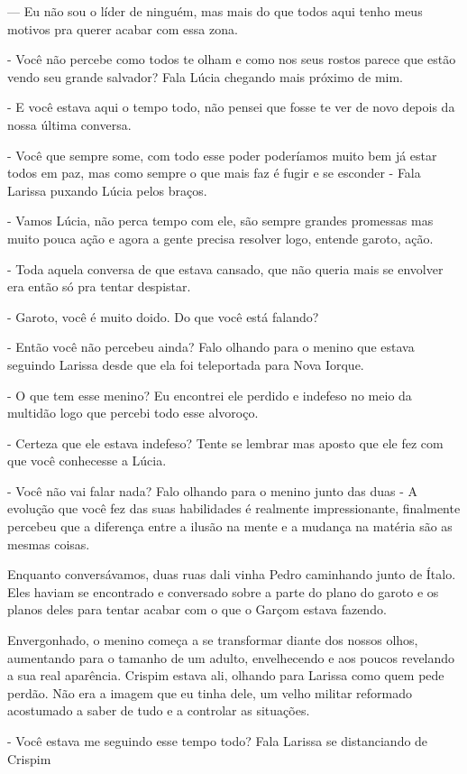 — Eu não sou o líder de ninguém, mas mais do que todos aqui tenho meus motivos pra querer acabar com essa zona.

- Você não percebe como todos te olham e como nos seus rostos parece que estão vendo seu grande salvador? Fala Lúcia chegando mais próximo de mim.

- E você estava aqui o tempo todo, não pensei que fosse te ver de novo depois da nossa última conversa.

- Você que sempre some, com todo esse poder poderíamos muito bem já estar todos em paz, mas como sempre o que mais faz é fugir e se esconder - Fala Larissa puxando Lúcia pelos braços.

- Vamos Lúcia, não perca tempo com ele, são sempre grandes promessas mas muito pouca ação e agora a gente precisa resolver logo, entende garoto, ação.

- Toda aquela conversa de que estava cansado, que não queria mais se envolver era então só pra tentar despistar.

- Garoto, você é muito doido. Do que você está falando?

- Então você não percebeu ainda? Falo olhando para o menino que estava seguindo Larissa desde que ela foi teleportada para Nova Iorque.

- O que tem esse menino? Eu encontrei ele perdido e indefeso no meio da multidão logo que percebi todo esse alvoroço.

- Certeza que ele estava indefeso? Tente se lembrar mas aposto que ele fez com que você conhecesse a Lúcia.

- Você não vai falar nada? Falo olhando para o menino junto das duas - A evolução que você fez das suas habilidades é realmente impressionante, finalmente percebeu que a diferença entre a ilusão na mente e a mudança na matéria são as mesmas coisas.

Enquanto conversávamos, duas ruas dali vinha Pedro caminhando junto de Ítalo. Eles haviam se encontrado e conversado sobre a parte do plano do garoto e os planos deles para tentar acabar com o que o Garçom estava fazendo.

Envergonhado, o menino começa a se transformar diante dos nossos olhos, aumentando para o tamanho de um adulto, envelhecendo e aos poucos revelando a sua real aparência. Crispim estava ali, olhando para Larissa como quem pede perdão. Não era a imagem que eu tinha dele, um velho militar reformado acostumado a saber de tudo e a controlar as situações.

- Você estava me seguindo esse tempo todo? Fala Larissa se distanciando de Crispim

